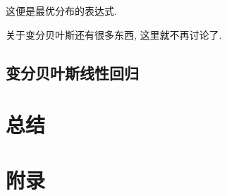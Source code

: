 \documentclass[a4paper,UTF8]{ctexart}
\theoremstyle{plain} \newtheorem{theorem}{定理}[section]
\theoremstyle{plain} \newtheorem{definition}{定义}[section]
\theoremstyle{plain} \newtheorem{lemma}{引理}[section]
\theoremstyle{plain} \newtheorem{proposition}{命题}[section]
\theoremstyle{plain} \newtheorem{example}{例}[section]
\theoremstyle{plain} \newtheorem{remark}{注}[section]
\theoremstyle{plain} \newtheorem{corollary}{推论}[section]
\begin{document}
这便是最优分布的表达式.

关于变分贝叶斯还有很多东西, 这里就不再讨论了.




\subsection{变分贝叶斯线性回归}






\section{总结}






\newpage

\section*{附录}
\end{document}
